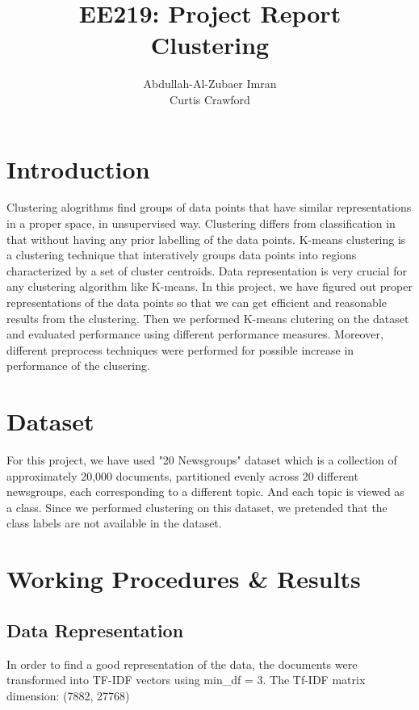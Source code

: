 \documentclass{article}
\author{Abdullah-Al-Zubaer Imran\\Curtis Crawford}
\title{EE219: Project Report \\ \textbf{Clustering}}
\date{}
\begin{document}
\maketitle

\section{Introduction}
Clustering alogrithms find groups of data points that have similar representations in a proper space, in unsupervised way. Clustering differs from classification in that without having any prior labelling of the data points. K-means clustering is a clustering technique that interatively groups data points into regions characterized by a set of cluster centroids. Data representation is very crucial for any clustering algorithm like K-means. In this project, we have figured out proper representations of the data points so that we can get efficient and reasonable results from the clustering. Then we performed K-means clutering on the dataset and evaluated performance using different performance measures. Moreover, different preprocess techniques were performed for possible increase in performance of the clusering. \\

\section{Dataset}
For this project, we have used "20 Newsgroups" dataset which is a collection of approximately 20,000 documents, partitioned evenly across 20 different newsgroups, each corresponding to a different topic. And each topic is viewed as a class. Since we performed clustering on this dataset, we pretended that the class labels are not available in the dataset. \\ 



\section{Working Procedures \& Results}

\subsection{Data Representation}
In order to find a good representation of the data, the documents were transformed into TF\--IDF vectors using min\_df = 3.
The Tf\--IDF matrix dimension: (7882, 27768) 
\end{document}
